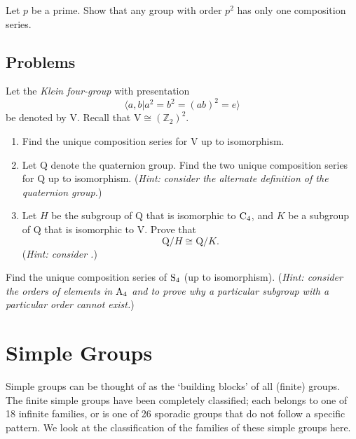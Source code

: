 \begin{exercise}
    Let $p$ be a prime. Show that any group with order $p^2$ has only one composition series.
\end{exercise}

\newpage

\section{Problems}
\begin{problem}
    Let the \textit{Klein four-group} with presentation
    \[
        \langle a, b \vert a^2 = b^2 = (ab)^2 = e \rangle
    \]
    be denoted by $\mathrm{V}$. Recall that $\mathrm{V} \cong (\mathbb{Z}_2)^2$.
    \begin{enumerate}[label=(\roman*)]
        \item Find the unique composition series for $\mathrm{V}$ up to isomorphism.
        \item Let $\mathrm{Q}$ denote the quaternion group. Find the two unique composition series for $\mathrm{Q}$ up to isomorphism.\newline
        (\textit{Hint: consider the alternate definition of the quaternion group.})
        \item Let $H$ be the subgroup of $\mathrm{Q}$ that is isomorphic to $\mathrm{C}_{4}$, and $K$ be a subgroup of $\mathrm{Q}$ that is isomorphic to $\mathrm{V}$. Prove that
        \[
            \mathrm{Q}/H \cong \mathrm{Q}/K.
        \]
        (\textit{Hint: consider .})
    \end{enumerate}
\end{problem}

\begin{problem}\label{problem-S4-composition-series}
    Find the unique composition series of $\mathrm{S}_{4}$ (up to isomorphism).\newline
    (\textit{Hint: consider the orders of elements in $\mathrm{A}_{4}$ and  to prove why a particular subgroup with a particular order cannot exist.})
\end{problem}

\chapter{Simple Groups}
Simple groups can be thought of as the `building blocks' of all (finite) groups. The finite simple groups have been completely classified; each belongs to one of 18 infinite families, or is one of 26 sporadic groups that do not follow a specific pattern. We look at the classification of the families of these simple groups here.

